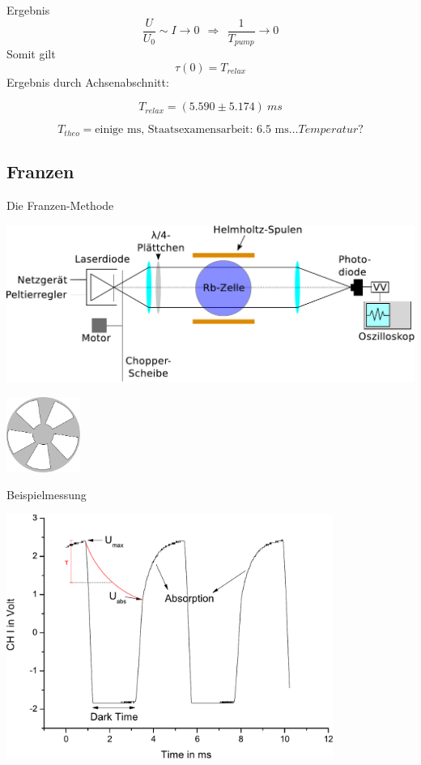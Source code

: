 \documentclass{beamer}
\begin{document}
\begin{frame}{Ergebnis}
$$\frac{U}{U_0} \sim I \to 0 \ \ \Rightarrow \ \ \frac{1}{T_{pump}} \to 0$$
Somit gilt $$\tau(0) = T_{relax}$$
Ergebnis durch Achsenabschnitt:

$$ T_{relax} = (5.590 \pm 5.174)\ ms$$ %

\pause $$T_{theo} = \text{einige ms, \ \ \ Staatsexamensarbeit: 6.5 ms} \dots Temperatur?$$

\end{frame}

\subsection{Franzen}
\begin{frame}{Die Franzen-Methode}
\begin{center}
\centering \includegraphics[width=\textwidth]{Bilder/ABFranzen.pdf}

\centering \includegraphics[width=0.18\textwidth]{Bilder/chopper.pdf}
\end{center}
\end{frame}

\begin{frame}{Beispielmessung}
\begin{center}
\centering \includegraphics[width=0.8\textwidth]{Bilder/FranzenBsp.pdf}
\end{center}
\end{frame}
\end{document}
